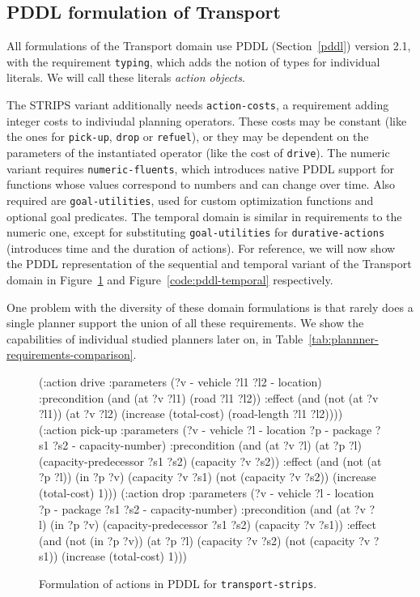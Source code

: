 \subsection{PDDL formulation of Transport}

All formulations of the Transport domain use PDDL (Section~\ref{pddl}) version 2.1,
with the requirement \verb+typing+, which adds the notion of types for individual
literals. We will call these literals \textit{action objects}.

The STRIPS variant additionally needs \verb+action-costs+, a requirement adding
integer costs to indiviudal planning operators. These costs may be constant
(like the ones for \verb+pick-up+, \verb+drop+ or \verb+refuel+),
or they may be dependent on the parameters of the instantiated operator (like
the cost of \verb+drive+).
The numeric variant
requires \verb+numeric-fluents+, which introduces native PDDL support for functions whose values correspond to numbers and can change over time. Also required are
\verb+goal-utilities+, used for custom optimization functions and optional goal predicates.
The temporal domain is similar in requirements to the numeric one, except for
substituting \verb+goal-utilities+ for \verb+durative-actions+ (introduces time
and the duration of actions).
For reference, we will now show the PDDL representation of the sequential and temporal variant of
the Transport domain in Figure~\ref{code:pddl-strips} and Figure~\ref{code:pddl-temporal} respectively.

One problem with the diversity of these domain formulations is that rarely does
a single planner support the union of all these requirements.
We show the capabilities of individual studied planners
later on, in Table~\ref{tab:plannner-requirements-comparison}.


\begin{figure}[tbp]
\begin{code}
(:action drive
  :parameters (?v - vehicle ?l1 ?l2 - location)
  :precondition (and
      (at ?v ?l1)
      (road ?l1 ?l2))
  :effect (and
      (not (at ?v ?l1))
      (at ?v ?l2)
      (increase (total-cost) (road-length ?l1 ?l2))))
(:action pick-up
  :parameters (?v - vehicle ?l - location ?p - package
               ?s1 ?s2 - capacity-number)
  :precondition (and
      (at ?v ?l)
      (at ?p ?l)
      (capacity-predecessor ?s1 ?s2)
      (capacity ?v ?s2))
  :effect (and
      (not (at ?p ?l))
      (in ?p ?v)
      (capacity ?v ?s1)
      (not (capacity ?v ?s2))
      (increase (total-cost) 1)))
(:action drop
  :parameters (?v - vehicle ?l - location ?p - package
               ?s1 ?s2 - capacity-number)
  :precondition (and
      (at ?v ?l)
      (in ?p ?v)
      (capacity-predecessor ?s1 ?s2)
      (capacity ?v ?s1))
  :effect (and
      (not (in ?p ?v))
      (at ?p ?l)
      (capacity ?v ?s2)
      (not (capacity ?v ?s1))
      (increase (total-cost) 1)))
\end{code}
\caption{Formulation of actions in PDDL for \texttt{transport-strips}.}
\label{code:pddl-strips}
\end{figure}

